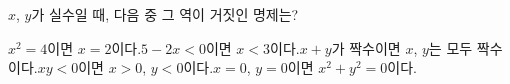 $x$, $y$가 실수일 때, 다음 중 그 역이 거짓인 명제는?
\begin{choicesv}{$x^2=4$이면 $x=2$이다.}{$5-2x<0$이면 $x<3$이다.}{$x+y$가 짝수이면 $x$, $y$는 모두 짝수이다.}{$xy<0$이면 $x>0$, $y<0$이다.}{$x=0$, $y=0$이면 $x^2+y^2=0$이다.}\end{choicesv}
